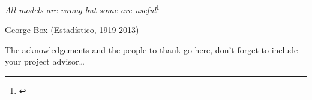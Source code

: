 \documentclass[
11pt, %
spanish, %
onehalfspacing, %
]{MastersDoctoralThesis_custom} %
\begin{document}
%
%
% 
% 
%
\cleardoublepage


\vspace*{0.05\textheight}

\hfill\textit{\large All models are wrong but some are useful}\footnote{\cite{box1979robustness}}\bigbreak

\hfill George Box (Estadístico, 1919-2013)



\clearpage
\begin{acknowledgements}
\addchaptertocentry{\acknowledgementname} %

The acknowledgements and the people to thank go here, don't forget to include your project advisor\ldots

\end{acknowledgements}
\clearpage
\end{document}
